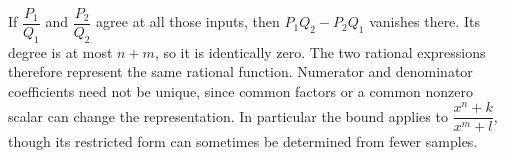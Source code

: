 If $ \dfrac{P_1}{Q_1} $ and $ \dfrac{P_2}{Q_2} $ agree at all those inputs, then $ P_1Q_2-P_2Q_1 $ vanishes there. Its degree is at most $ n+m $, so it is identically zero. The two rational expressions therefore represent the same rational function. Numerator and denominator coefficients need not be unique, since common factors or a common nonzero scalar can change the representation. In particular the bound applies to $\dfrac{x^n+k}{x^m+l}$, though its restricted form can sometimes be determined from fewer samples.
